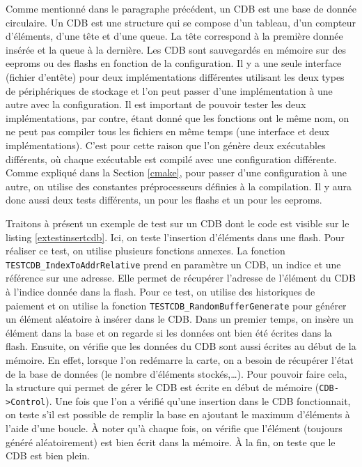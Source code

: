 \documentclass[a4paper]{article}
\begin{document}
Comme mentionné dans le paragraphe précédent, un CDB est une base de donnée
circulaire. Un CDB est une structure qui se compose d'un tableau, d'un compteur
d'éléments, d'une tête et d'une queue. La tête correspond à la première donnée
insérée et la queue à la dernière. Les CDB sont sauvegardés en mémoire sur des
eeproms ou des flashs en fonction de la configuration. Il y a une seule
interface (fichier d'entête) pour deux implémentations différentes utilisant les
deux types de périphériques de stockage et l'on peut passer d'une implémentation à
une autre avec la configuration. Il est important de pouvoir tester les deux
implémentations, par contre, étant donné que les fonctions ont le même nom, on
ne peut pas compiler tous les fichiers en même temps (une interface et deux
implémentations). C'est pour cette raison que l'on génère deux exécutables
différents, où chaque exécutable est compilé avec une configuration différente.
Comme expliqué dans la Section \ref{cmake}, pour passer d'une configuration à
une autre, on utilise des constantes préprocesseurs définies à la compilation.
Il y aura donc aussi deux tests différents, un pour les flashs et un pour les
eeproms.

Traitons à présent un exemple de test sur un CDB dont le code est visible sur le
listing \ref{extestinsertcdb}. Ici, on teste l'insertion d'éléments dans une
flash. Pour réaliser ce test, on utilise plusieurs fonctions annexes. La
fonction \verb|TESTCDB_IndexToAddrRelative| prend en paramètre un CDB, un indice
et une référence sur une adresse. Elle permet de récupérer l'adresse de
l'élément du CDB à l'indice donnée dans la flash. Pour ce test, on utilise des
historiques de paiement et on utilise la fonction
\verb|TESTCDB_RandomBufferGenerate| pour générer un élément aléatoire à insérer
dans le CDB. Dans un premier temps, on insère un élément dans la base et on
regarde si les données ont bien été écrites dans la flash. Ensuite, on vérifie
que les données du CDB sont aussi écrites au début de la mémoire. En effet,
lorsque l'on redémarre la carte, on a besoin de récupérer l'état de la base de
données (le nombre d'éléments stockés,\dots). Pour pouvoir faire cela, la
structure qui permet de gérer le CDB est écrite en début de mémoire
(\verb|CDB->Control|). Une fois que l'on a vérifié qu'une insertion dans le CDB
fonctionnait, on teste s'il est possible de remplir la base en ajoutant le
maximum d'éléments à l'aide d'une boucle. À noter qu'à chaque fois, on vérifie
que l'élément (toujours généré aléatoirement) est bien écrit dans la mémoire. À
la fin, on teste que le CDB est bien plein.
\end{document}
